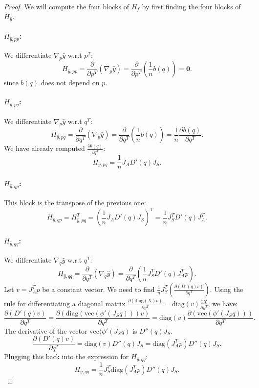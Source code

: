 \documentclass[a4paper,11pt]{article}
\newcommand{\1}{\mathbbm{1}}
\theoremstyle{plain}
\newcommand{\vecop}{\mathrm{vec}}
\newcommand{\diag}{\mathrm{diag}}
\begin{document}
\begin{proof}
We will compute the four blocks of $H_f$ by first finding the four blocks of $H_{\hat{y}}$.

\paragraph{$H_{\hat{y}, pp}$:}
We differentiate $\nabla_p \hat{y}$ w.r.t $p^T$:
$$
H_{\hat{y}, pp} = \frac{\partial}{\partial p^T} (\nabla_p \hat{y}) = \frac{\partial}{\partial p^T} \left( \frac{1}{n} b(q) \right) = \mathbf{0}.
$$
since $b(q)$ does not depend on $p$.

\paragraph{$H_{\hat{y}, pq}$:}
We differentiate $\nabla_p \hat{y}$ w.r.t $q^T$:
$$
H_{\hat{y}, pq} = \frac{\partial}{\partial q^T} (\nabla_p \hat{y}) = \frac{\partial}{\partial q^T} \left( \frac{1}{n} b(q) \right) = \frac{1}{n} \frac{\partial b(q)}{\partial q^T}.
$$
We have already computed $\frac{\partial b(q)}{\partial q^T}$:
$$
H_{\hat{y}, pq} = \frac{1}{n} J_A D'(q) J_S.
$$

\paragraph{$H_{\hat{y}, qp}$:}
This block is the transpose of the previous one:
$$
H_{\hat{y}, qp} = H_{\hat{y}, pq}^T = \left( \frac{1}{n} J_A D'(q) J_S \right)^T = \frac{1}{n} J_S^T D'(q) J_A^T.
$$

\paragraph{$H_{\hat{y}, qq}$:}
We differentiate $\nabla_q \hat{y}$ w.r.t $q^T$:
$$
H_{\hat{y}, qq} = \frac{\partial}{\partial q^T} (\nabla_q \hat{y}) = \frac{\partial}{\partial q^T} \left( \frac{1}{n} J_S^T D'(q) J_A^T p \right).
$$
Let $v = J_A^T p$ be a constant vector. We need to find $\frac{1}{n} J_S^T \left( \frac{\partial (D'(q) v)}{\partial q^T} \right)$.
Using the rule for differentiating a diagonal matrix $\frac{\partial (\diag(X) v)}{\partial y^T} = \diag(v) \frac{\partial X}{\partial y^T}$, we have:
$$
\frac{\partial (D'(q) v)}{\partial q^T} = \frac{\partial (\diag(\vecop(\phi'(J_S q))) v)}{\partial q^T} = \diag(v) \frac{\partial (\vecop(\phi'(J_S q)))}{\partial q^T}.
$$
The derivative of the vector $\vecop(\phi'(J_S q)$ is $D''(q) J_S$.
$$
\frac{\partial (D'(q) v)}{\partial q^T} = \diag(v) D''(q) J_S = \diag(J_A^T p) D''(q) J_S.
$$
Plugging this back into the expression for $H_{\hat{y}, qq}$:
$$
H_{\hat{y}, qq} = \frac{1}{n} J_S^T \diag(J_A^T p) D''(q) J_S.
$$


\end{proof}
\end{document}

